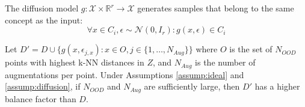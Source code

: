 \begin{assumption}
\label{assump:diffusion}
The diffusion model $g: \mathcal{X} \times \mathbb{R}^r \rightarrow \mathcal{X}$ generates samples that belong to the same concept as the input:
\begin{equation}
\forall x \in C_i, \epsilon \sim \mathcal{N}(0, I_r): g(x, \epsilon) \in C_i
\end{equation}
\end{assumption}

\begin{theorem}
\label{thm:augment}
Let $D' = D \cup \{g(x, \epsilon_{j,x}) : x \in O, j \in \{1,\ldots,N_{Aug}\}\}$ where $O$ is the set of $N_{OOD}$ points with highest k-NN distances in $Z$, and $N_{Aug}$ is the number of augmentations per point. Under Assumptions \ref{assump:ideal} and \ref{assump:diffusion}, if $N_{OOD}$ and $N_{Aug}$ are sufficiently large, then $D'$ has a higher balance factor than $D$.
\end{theorem}

